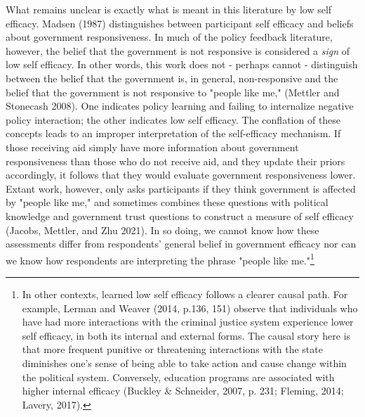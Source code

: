 \documentclass[12pt]{paper}
\begin{document}
What remains unclear is exactly what is meant in this literature by low self efficacy. Madsen (1987) distinguishes between participant self efficacy and beliefs about government responsiveness. In much of the policy feedback literature, however, the belief that the government is not responsive is considered a \textit{sign} of low self efficacy. In other words, this work does not - perhaps cannot - distinguish between the belief that the government is, in general, non-responsive and the belief that the government is not responsive to "people like me," (Mettler and Stonecash 2008). One indicates policy learning and failing to internalize negative policy interaction; the other indicates low self efficacy. The conflation of these concepts leads to an improper interpretation of the self-efficacy mechanism. If those receiving aid simply have more information about government responsiveness than those who do not receive aid, and they update their priors accordingly, it follows that they would evaluate government responsiveness lower. Extant work, however, only asks participants if they think government is affected by "people like me," and sometimes combines these questions with political knowledge and government trust questions to construct a measure of self efficacy (Jacobs, Mettler, and Zhu 2021). In so doing, we cannot know how these assessments differ from respondents' general belief in government efficacy nor can we know how respondents are interpreting the phrase "people like me."\footnote{In other contexts, learned low self efficacy follows a clearer causal path. For example, Lerman and Weaver (2014, p.136, 151) observe that individuals who have had more interactions with the criminal justice system experience lower self efficacy, in both its internal and external forms. The causal story here is that more frequent punitive or threatening interactions with the state diminishes one's sense of being able to take action and cause change within the political system. Conversely, education programs are associated with higher internal efficacy (Buckley \& Schneider, 2007, p. 231; Fleming, 2014; Lavery, 2017).}
\end{document}
